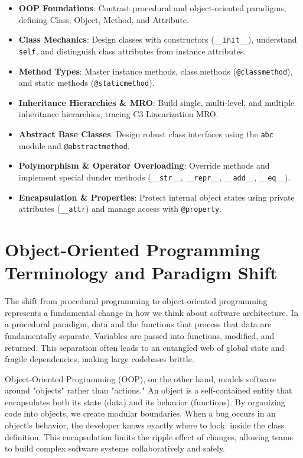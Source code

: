 \begin{itemize}[leftmargin=1.5em]
    \item \textbf{OOP Foundations}: Contrast procedural and object-oriented paradigms, defining Class, Object, Method, and Attribute.
    \item \textbf{Class Mechanics}: Design classes with constructors (\texttt{\_\_init\_\_}), understand \texttt{self}, and distinguish class attributes from instance attributes.
    \item \textbf{Method Types}: Master instance methods, class methods (\texttt{@classmethod}), and static methods (\texttt{@staticmethod}).
    \item \textbf{Inheritance Hierarchies \& MRO}: Build single, multi-level, and multiple inheritance hierarchies, tracing C3 Linearization MRO.
    \item \textbf{Abstract Base Classes}: Design robust class interfaces using the \texttt{abc} module and \texttt{@abstractmethod}.
    \item \textbf{Polymorphism \& Operator Overloading}: Override methods and implement special dunder methods (\texttt{\_\_str\_\_}, \texttt{\_\_repr\_\_}, \texttt{\_\_add\_\_}, \texttt{\_\_eq\_\_}).
    \item \textbf{Encapsulation \& Properties}: Protect internal object states using private attributes (\texttt{\_\_attr}) and manage access with \texttt{@property}.
\end{itemize}

\section{Object-Oriented Programming Terminology and Paradigm Shift}

The shift from procedural programming to object-oriented programming represents a fundamental change in how we think about software architecture. In a procedural paradigm, data and the functions that process that data are fundamentally separate. Variables are passed into functions, modified, and returned. This separation often leads to an entangled web of global state and fragile dependencies, making large codebases brittle.

Object-Oriented Programming (OOP), on the other hand, models software around "objects" rather than "actions." An object is a self-contained entity that encapsulates both its state (data) and its behavior (functions). By organizing code into objects, we create modular boundaries. When a bug occurs in an object's behavior, the developer knows exactly where to look: inside the class definition. This encapsulation limits the ripple effect of changes, allowing teams to build complex software systems collaboratively and safely.


